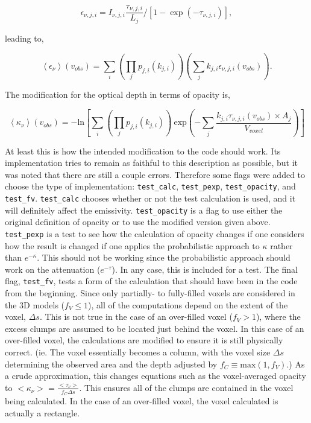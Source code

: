 \documentclass[a4paper]{article}
\begin{document}
    \[
    \epsilon_{\nu,j,i} = I_{\nu,j,i} \frac{\tau_{\nu,j,i}} {L_{j}} / [ 1 - \exp(-\tau_{\nu,j,i}) ],
    \]

    leading to,

    \[
    \left< \epsilon_\nu \right> (v_{obs}) = \sum_i \left( \prod_j p_{j,i}(k_{j,i}) \right) \left( \sum_j k_{j,i} \epsilon_{\nu,j,i} (v_{obs}) \right).
    \]

    The modification for the optical depth in terms of opacity is,

    \[
    \left< \kappa_\nu \right> (v_{obs}) = -\mathrm{ln} \left[ \sum_i \left( \prod_j p_{j,i}(k_{j,i}) \right) \ \mathrm{exp} \left( - \sum_j \frac{k_{j,i} \tau_{\nu,j,i} (v_{obs}) \times A_{j}}{V_{voxel}} \right) \right]
    \]

    At least this is how the intended modification to the code should work.
    Its implementation tries to remain as faithful to this description as possible, but it was noted that there are still a couple errors.
    Therefore some flags were added to choose the type of implementation: \texttt{test\_calc}, \texttt{test\_pexp}, \texttt{test\_opacity}, and \texttt{test\_fv}.
    \texttt{test\_calc} chooses whether or not the test calculation is used, and it will definitely affect the emissivity.
    \texttt{test\_opacity} is a flag to use either the original definition of opacity or to use the modified version given above.
    \texttt{test\_pexp} is a test to see how the calculation of opacity changes if one considers how the result is changed if one applies the probabilistic approach to \(\kappa\) rather than \(e^{-\kappa}\).
    This should not be working since the probabilistic approach should work on the attenuation (\(e^{-\tau}\)).
    In any case, this is included for a test.
    The final flag, \texttt{test\_fv}, tests a form of the calculation that should have been in the code from the beginning.
    Since only partially- to fully-filled voxels are considered in the 3D models (\(f_V \leq 1\)), all of the computations depend on the extent of the voxel, \(\Delta s\).
    This is not true in the case of an over-filled voxel (\(f_V > 1\)), where the excess clumps are assumed to be located just behind the voxel.
    In this case of an over-filled voxel, the calculations are modified to ensure it is still physically correct.
    (ie. The voxel essentially becomes a column, with the voxel size \(\Delta s\) determining the observed area and the depth adjusted by \(f_C \equiv \mathrm{max}(1, f_V)\).)
    As a crude approximation, this changes equations such as the voxel-averaged opacity to \(<\kappa_\nu> = \frac{<\tau_\nu>}{f_C \Delta s}\).
    This ensures all of the clumps are contained in the voxel being calculated.
    In the case of an over-filled voxel, the voxel calculated is actually a rectangle.
\end{document}
